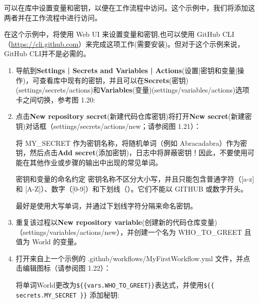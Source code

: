 
可以在库中设置变量和密钥，以便在工作流程中访问。这个示例中，我们将添加这两者并在工作流程中进行访问。


在这个示例中，将使用 Web UI 来设置变量和密钥,也可以使用 GitHub CLI（\url{https://cli.github.com}）来完成这项工作(需要安装)。但对于这个示例来说，GitHub CLI并不是必需的。


\begin{enumerate}
\item 
导航到\textbf{Settings | Secrets and Variables | Actions}(设置|密钥和变量|操作)，可查看库中现有的密钥，并且可以在\textbf{Secrets}(密钥)(settings/secrets/actions)和\textbf{Variables}(变量)(settings/variables/actions)选项卡之间切换，参考图 1.20:


\item 
点击\textbf{New repository secret}(新建代码仓库密钥)将打开\textbf{New secret}(新建密钥)对话框（settings/secrets/actions/new；请参阅图 1.21）：


将 MY\_SECRET 作为密钥名称，将随机单词（例如 Abracadabra）作为密钥，然后点击\textbf{Add secret}(添加密钥)，日志中将屏蔽密钥！因此，不要使用可能在其他作业或步骤的输出中出现的常见单词。

\begin{myTip}{密钥和变量的命名约定}
密钥名称不区分大小写，并且只能包含普通字符（[a-z] 和 [A-Z]）、数字（[0-9]）和下划线（）。它们不能以 GITHUB 或数字开头。

最好是使用大写单词，并通过下划线字符分隔来命名密钥。
\end{myTip}

\item 
重复该过程以\textbf{New repository variable}(创建新的代码仓库变量)（settings/variables/actions/new），并创建一个名为 WHO\_TO\_GREET 且值为 World 的变量。

\item 
打开来自上一个示例的 .github/workflows/MyFirstWorkflow.yml 文件，并点击编辑图标（请参阅图 1.22）：


将单词World更改为\verb|${{vars.WHO_TO_GREET}}|表达式，并使用\verb|${{ secrets.MY_SECRET }}| 添加秘钥:


\end{enumerate}
